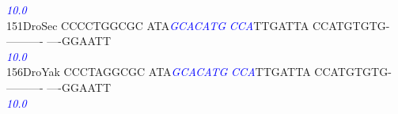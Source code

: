 \documentclass[11pt,twoside,reqno,a4paper]{article}
\begin{document}
{\hspace*{4\charwidth}\hspace*{7\charwidth}\hspace*{1\charwidth}\hspace*{13\charwidth}\textit{\textcolor{Blue}{10.0}}\hspace*{1\charwidth}\hspace*{1\charwidth}\hspace*{1\charwidth}\hspace*{1\charwidth}\hspace*{1\charwidth}\\
151\hspace*{1\charwidth}DroSec	CCCCTGGCGC	ATA\textit{\textcolor{Blue}{G}}\textit{\textcolor{Blue}{C}}\textit{\textcolor{Blue}{A}}\textit{\textcolor{Blue}{C}}\textit{\textcolor{Blue}{A}}\textit{\textcolor{Blue}{T}}\textit{\textcolor{Blue}{G}}	\textit{\textcolor{Blue}{C}}\textit{\textcolor{Blue}{C}}\textit{\textcolor{Blue}{A}}TTGATTA	CCATGTGTG-	----------	----GGAATT	\\
\hspace*{4\charwidth}\hspace*{7\charwidth}\hspace*{1\charwidth}\hspace*{13\charwidth}\textit{\textcolor{Blue}{10.0}}\hspace*{1\charwidth}\hspace*{1\charwidth}\hspace*{1\charwidth}\hspace*{1\charwidth}\hspace*{1\charwidth}\\
156\hspace*{1\charwidth}DroYak	CCCTAGGCGC	ATA\textit{\textcolor{Blue}{G}}\textit{\textcolor{Blue}{C}}\textit{\textcolor{Blue}{A}}\textit{\textcolor{Blue}{C}}\textit{\textcolor{Blue}{A}}\textit{\textcolor{Blue}{T}}\textit{\textcolor{Blue}{G}}	\textit{\textcolor{Blue}{C}}\textit{\textcolor{Blue}{C}}\textit{\textcolor{Blue}{A}}TTGATTA	CCATGTGTG-	----------	----GGAATT	\\
\hspace*{4\charwidth}\hspace*{7\charwidth}\hspace*{1\charwidth}\hspace*{13\charwidth}\textit{\textcolor{Blue}{10.0}}\hspace*{1\charwidth}\hspace*{1\charwidth}\hspace*{1\charwidth}\hspace*{1\charwidth}\hspace*{1\charwidth}\\
}
\end{document}
